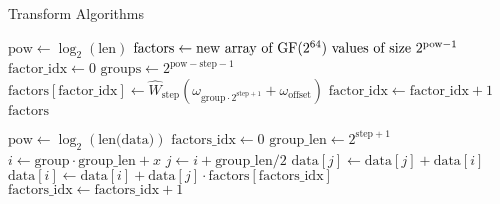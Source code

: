 \begin{algorithm}
    \caption{Transform Algorithms}
    \begin{algorithmic}
            \State $\text{pow} \gets \log_2(\text{len})$
            \State $\text{factors} \gets \text{new array of $\text{GF}(2^{64})$ values of size } 2^{\text{pow} - 1}$
            \State $\text{factor\_idx} \gets 0$
                \State $\text{groups} \gets 2^{\text{pow} - \text{step} - 1}$
                    \State $\text{factors}[\text{factor\_idx}] \gets \hat{W}_{\text{step}}(\omega_{\text{group} \cdot 2^{\text{step} + 1}} + \omega_{\text{offset}})$
                    \State $\text{factor\_idx} \gets \text{factor\_idx} + 1$
                \EndFor
            \EndFor
            \State \Return $\text{factors}$
        \EndFunction
    \end{algorithmic}

    \begin{algorithmic}
            \State $\text{pow} \gets \log_2(\text{len(data)})$
            \State $\text{factors\_idx} \gets 0$
                \State $\text{group\_len} \gets 2^{\text{step} + 1}$
                        \State $i \gets \text{group} \cdot \text{group\_len} + x$
                        \State $j \gets i + \text{group\_len} / 2$
                        \State $\text{data}[j] \gets \text{data}[j] + \text{data}[i]$
                        \State $\text{data}[i] \gets \text{data}[i] + \text{data}[j] \cdot \text{factors}[\text{factors\_idx}]$
                    \EndFor
                    \State $\text{factors\_idx} \gets \text{factors\_idx} + 1$
                \EndFor
            \EndFor
        \EndFunction
    \end{algorithmic}


\end{algorithm}

